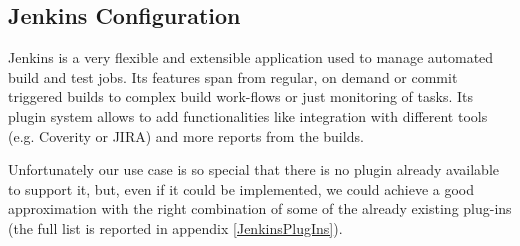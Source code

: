 \documentclass{lhcbnote}
\begin{document}
\subsection{Jenkins Configuration}
\label{Jenkins}
Jenkins is a very flexible and extensible application used to manage automated
build and test jobs.  Its features span from regular, on demand or commit
triggered builds to complex build work-flows or just monitoring of tasks.  Its
plugin system allows to add functionalities like integration with different
tools (e.g. Coverity or JIRA) and more reports from the builds.

Unfortunately our use case is so special that there is no plugin already
available to support it, but, even if it could be implemented, we could achieve
a good approximation with the right combination of some of the already existing
plug-ins (the full list is reported in appendix \ref{JenkinsPlugIns}).
\end{document}
